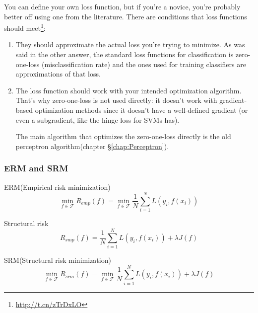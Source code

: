 You can define your own loss function, but if you're a novice, you're probably better off using one from the literature. There are conditions that loss functions should meet\footnote{\url{http://t.cn/zTrDxLO}}:
\begin{enumerate}
\item They should approximate the actual loss you're trying to minimize. As was said in the other answer, the standard loss functions for classification is zero-one-loss (misclassification rate) and the ones used for training classifiers are approximations of that loss.
\item The loss function should work with your intended optimization algorithm. That's why zero-one-loss is not used directly: it doesn't work with gradient-based optimization methods since it doesn't have a well-defined gradient (or even a subgradient, like the hinge loss for SVMs has).

The main algorithm that optimizes the zero-one-loss directly is the old perceptron algorithm(chapter \S \ref{chap:Perceptron}).
\end{enumerate}


\subsubsection{ERM and SRM}
\begin{definition}
ERM(Empirical risk minimization)
\begin{equation}
\min\limits _{f \in \mathcal{F}} R_{emp}(f)=\min\limits _{f \in \mathcal{F}} \dfrac{1}{N}\sum\limits_{i=1}^{N} L\left(y_i,f(x_i)\right)
\end{equation}
\end{definition}

\begin{definition}
Structural risk
\begin{equation}
R_{smp}(f)=\dfrac{1}{N}\sum\limits_{i=1}^{N} L\left(y_i,f(x_i)\right) +\lambda J(f)
\end{equation}
\end{definition}

\begin{definition}
SRM(Structural risk minimization)
\begin{equation}
\min\limits _{f \in \mathcal{F}} R_{srm}(f)=\min\limits _{f \in \mathcal{F}} \dfrac{1}{N}\sum\limits_{i=1}^{N} L\left(y_i,f(x_i)\right) +\lambda J(f)
\end{equation}
\end{definition}


